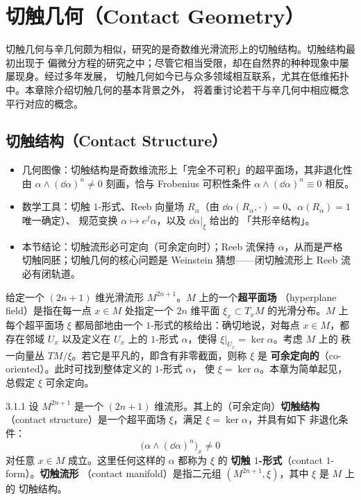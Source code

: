 \chapter{切触几何（Contact Geometry）}

切触几何与辛几何颇为相似，研究的是奇数维光滑流形上的切触结构。切触结构最初出现于
偏微分方程的研究之中；尽管它相当受限，却在自然界的种种现象中屡屡现身。经过多年发展，
切触几何如今已与众多领域相互联系，尤其在低维拓扑中。本章除介绍切触几何的基本背景之外，
将着重讨论若干与辛几何中相应概念平行对应的概念。

\section{切触结构（Contact Structure）}

\begin{keytakeaways}
\begin{itemize}
  \item 几何图像：切触结构是奇数维流形上「完全不可积」的超平面场，其非退化性由
        $\alpha\wedge(\dd\alpha)^n\neq 0$ 刻画，恰与 Frobenius 可积性条件
        $\alpha\wedge(\dd\alpha)^n\equiv 0$ 相反。
  \item 数学工具：切触 $1$-形式、Reeb 向量场 $R_\alpha$（由
        $\dd\alpha(R_\alpha,\cdot)=0$、$\alpha(R_\alpha)=1$ 唯一确定）、
        规范变换 $\alpha\mapsto e^f\alpha$，以及 $\dd\alpha|_\xi$ 给出的
        「共形辛结构」。
  \item 本节结论：切触流形必可定向（可余定向时）；Reeb 流保持 $\alpha$，从而是严格
        切触同胚；切触几何的核心问题是 Weinstein 猜想——闭切触流形上 Reeb 流必有闭轨道。
\end{itemize}
\end{keytakeaways}

给定一个 $(2n+1)$ 维光滑流形 $M^{2n+1}$。$M$ 上的一个\textbf{超平面场}
（hyperplane field）是指在每一点 $x\in M$ 处指定一个 $2n$ 维平面
$\xi_x\subset T_xM$ 的光滑分布。$M$ 上每个超平面场 $\xi$ 都局部地由一个
$1$-形式的核给出：确切地说，对每点 $x\in M$，都存在邻域 $U_x$ 以及定义在
$U_x$ 上的 $1$-形式 $\alpha$，使得 $\xi|_{U_x}=\ker\alpha$。考虑 $M$ 上的
秩一向量丛 $TM/\xi$。若它是平凡的，即含有非零截面，则称 $\xi$ 是
\textbf{可余定向的}（co-oriented）。此时可找到整体定义的 $1$-形式 $\alpha$，
使 $\xi=\ker\alpha$。本章为简单起见，总假定 $\xi$ 可余定向。

\begin{wdefn}{3.1.1}
设 $M^{2n+1}$ 是一个 $(2n+1)$ 维流形。其上的（可余定向）\textbf{切触结构}
（contact structure）是一个超平面场 $\xi$，满足 $\xi=\ker\alpha$，并具有如下
非退化条件：
\begin{equation}\tag{3.1}
  \bigl(\alpha\wedge(\dd\alpha)^n\bigr)_x\neq 0
\end{equation}
对任意 $x\in M$ 成立。这里任何这样的 $\alpha$ 都称为 $\xi$ 的
\textbf{切触 $1$-形式}（contact $1$-form）。\textbf{切触流形}
（contact manifold）是指二元组 $(M^{2n+1},\xi)$，其中 $\xi$ 是 $M$ 上的
切触结构。
\end{wdefn}

